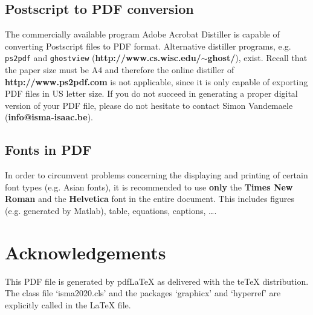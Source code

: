 \documentclass{ISMA_USD2020}
\begin{document}
\subsection{Postscript to PDF conversion \label{s:ps2pdf}}

The commercially available program Adobe Acrobat Distiller is capable of converting Postscript files to PDF format. Alternative distiller programs, e.g. {\tt ps2pdf} and {\tt ghostview} (\textbf{http://www.cs.wisc.edu/$\sim$ghost/}), exist. Recall that the paper size must be A4 and therefore the online distiller of \textbf{http://www.ps2pdf.com} is not applicable, since it is only capable of exporting PDF files in US letter size. If you do not succeed in generating a proper digital version of your PDF file, please do not hesitate to contact Simon Vandemaele (\textbf{info@isma-isaac.be}).

\subsection{Fonts in PDF \label{s:pdf-fonts}}

In order to circumvent problems concerning the displaying and printing of certain font types (e.g. Asian fonts), it is recommended to use \textbf{only} the \textbf{Times New Roman} and the \textbf{Helvetica} font in the entire document. This includes figures (e.g. generated by {\sc Matlab}), table, equations, captions, \ldots.


\section*{Acknowledgements}

This PDF file is generated by pdf\LaTeX{} as delivered with the te\TeX{} distribution. The class file `isma2020.cls' and the packages `graphicx' and `hyperref' are explicitly called in the \LaTeX{} file.





\end{document}
